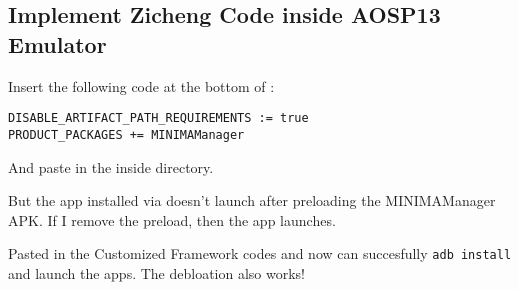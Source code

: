 \subsection{Implement Zicheng Code inside AOSP13 Emulator}

Insert the following code at the bottom of : 
\begin{lstlisting}
DISABLE_ARTIFACT_PATH_REQUIREMENTS := true
PRODUCT_PACKAGES += MINIMAManager
\end{lstlisting}
And paste in the  inside  directory.

But the app installed via  doesn't launch after preloading the MINIMAManager APK. If I remove the preload, then the app launches.

Pasted in the Customized Framework codes and now can succesfully \texttt{adb install} and launch the apps. The debloation also works!
